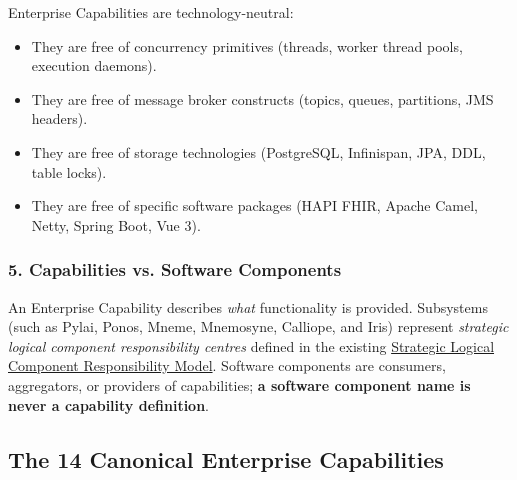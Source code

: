Enterprise Capabilities are technology-neutral:

\label{rad:enterprise:70}

\begin{itemize}

\item
They are free of concurrency primitives (threads, worker thread pools, execution daemons).



\item
They are free of message broker constructs (topics, queues, partitions, JMS headers).



\item
They are free of storage technologies (PostgreSQL, Infinispan, JPA, DDL, table locks).



\item
They are free of specific software packages (HAPI FHIR, Apache Camel, Netty, Spring Boot, Vue 3).



\end{itemize}
\label{rad:enterprise:75}
\subsubsection*{5. Capabilities vs. Software Components}
\label{rad:enterprise:76}

An Enterprise Capability describes \emph{what} functionality is provided. Subsystems (such as Pylai, Ponos, Mneme, Mnemosyne, Calliope, and Iris) represent \emph{strategic logical component responsibility centres} defined in the existing \href{https://github.com/fhirfactory/harmonia/blob/98410db60155198a75f74c79d98060070209faa1/docs/markdown/02-strategy/strategic-views/logical-component-responsibilities.md}{Strategic Logical Component Responsibility Model}. Software components are consumers, aggregators, or providers of capabilities; \textbf{a software component name is never a capability definition}.

\label{rad:enterprise:78}

\par\smallskip
{}\label{rad:enterprise:80}
\subsection*{The 14 Canonical Enterprise Capabilities}
\label{rad:enterprise:82}


